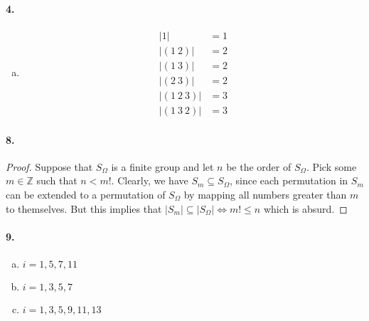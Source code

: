 \documentclass{article}
\begin{document}
\paragraph{4.}
\begin{enumerate}[(a)]
  \item \begin{align*}
      |1| &= 1 \\
      |(1\ 2)| &= 2 \\
      |(1\ 3)| &= 2 \\
      |(2\ 3)| &= 2 \\
      |(1\ 2\ 3)| &= 3 \\
      |(1\ 3\ 2)| &= 3
  \end{align*}
\end{enumerate}

\paragraph{8.}
\begin{proof}
  Suppose that $S_\Omega$ is a finite group and let $n$ be the order of
  $S_\Omega$. Pick some $m \in \mathbb{Z}$ such that $n < m!$. Clearly, we have
  $S_m \subseteq S_\Omega$, since each permutation in $S_m$ can be extended to
  a permutation of $S_\Omega$ by mapping all numbers greater than $m$ to
  themselves. But this implies that $|S_m| \subseteq |S_\Omega| \iff m! \leq n$
  which is absurd.
\end{proof}

\paragraph{9.}
\begin{enumerate}[(a)]
  \item $i = 1, 5, 7, 11$
  \item $i = 1, 3, 5, 7$
  \item $i = 1, 3, 5, 9, 11, 13$
\end{enumerate}
\end{document}
